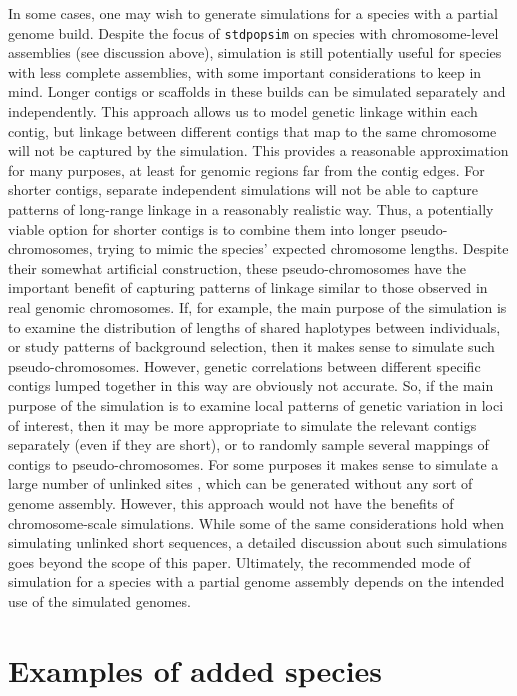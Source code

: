 \documentclass[hidelinks]{article}
\makeatletter
\newcommand{\stdpopsim}{\texttt{stdpopsim}\xspace}
\newcommand{\labelname}[1]{\def\@currentlabelname{#1}}
\makeatother
\begin{document}
In some cases, one may wish to generate simulations for a species with a partial genome build.
Despite the focus of \stdpopsim  on species with chromosome-level assemblies (see discussion above), simulation is still potentially useful for species with less complete assemblies, with some important considerations to keep in mind.
Longer contigs or scaffolds in these builds can be simulated separately and independently.
This approach allows us to model genetic linkage within each contig,
but linkage between different contigs that map to the same chromosome will not be captured by the simulation.
This provides a reasonable approximation for many purposes, at least for genomic regions far from the contig edges.
For shorter contigs, separate independent simulations will not be able to capture patterns of long-range linkage in a reasonably realistic way.
Thus, a potentially viable option for shorter contigs is to combine them into longer pseudo-chromosomes, trying to mimic the species' expected chromosome lengths.
Despite their somewhat artificial construction,
these pseudo-chromosomes have the important benefit of
capturing patterns of linkage similar to those observed in real genomic chromosomes.
If, for example, the main purpose of the simulation is to examine the distribution of lengths of shared haplotypes between individuals,
or study patterns of background selection,
then it makes sense to simulate such pseudo-chromosomes.
However, genetic correlations between different specific contigs lumped together in this way are obviously not accurate.
So, if the main purpose of the simulation is to examine local patterns of genetic variation in loci of interest, then it may be more appropriate to simulate the relevant contigs separately (even if they are short), or to randomly sample several mappings of contigs to pseudo-chromosomes.
For some purposes it makes sense to simulate a large number of unlinked sites \citep{Gutenkunst2009,Excoffier2013},
which can be generated without any sort of genome assembly.
However, this approach would not have the benefits of chromosome-scale simulations.
While some of the same considerations hold when simulating unlinked short sequences, a detailed discussion about such simulations goes beyond the scope of this paper.
Ultimately, the recommended mode of simulation for a species with a partial genome assembly depends on the intended use of the simulated genomes.

\section*{Examples of added species}
    \labelname{Examples}
    \label{sec:examples}
\end{document}
